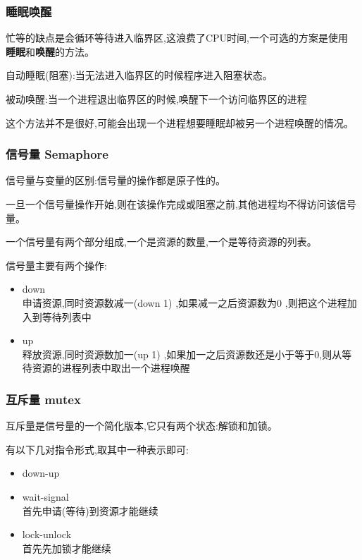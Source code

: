 \documentclass[UTF8,a4paper]{ctexart}
\begin{document}
      \subsubsection{睡眠唤醒}

      忙等的缺点是会循环等待进入临界区,这浪费了CPU时间,一个可选的方案是使用 \textbf{睡眠}和\textbf{唤醒}的方法。

      自动睡眠(阻塞):当无法进入临界区的时候程序进入阻塞状态。

      被动唤醒:当一个进程退出临界区的时候,唤醒下一个访问临界区的进程

      这个方法并不是很好,可能会出现一个进程想要睡眠却被另一个进程唤醒的情况。

      \subsubsection{信号量 Semaphore}
      信号量与变量的区别:信号量的操作都是原子性的。

      一旦一个信号量操作开始,则在该操作完成或阻塞之前,其他进程均不得访问该信号量。

      一个信号量有两个部分组成,一个是资源的数量,一个是等待资源的列表。

      信号量主要有两个操作:
      \begin{itemize}
        \item down\\
        申请资源,同时资源数减一(down 1) ,如果减一之后资源数为0 ,则把这个进程加入到等待列表中
        \item up\\
        释放资源,同时资源数加一(up 1) ,如果加一之后资源数还是小于等于0,则从等待资源的进程列表中取出一个进程唤醒
      \end{itemize}

      \subsubsection{互斥量 mutex}
      互斥量是信号量的一个简化版本,它只有两个状态:解锁和加锁。

      有以下几对指令形式,取其中一种表示即可:
      \begin{itemize}
        \item down-up
        \item wait-signal\\
        首先申请(等待)到资源才能继续
        \item lock-unlock\\
        首先先加锁才能继续
      \end{itemize}
\end{document}
